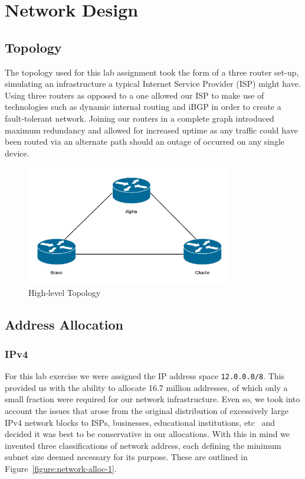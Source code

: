 \chapter{Network Design}

\section{Topology}

The topology used for this lab assignment took the form of a three router set-up,
simulating an infrastructure a typical Internet Service Provider (ISP)
might have. Using three routers as opposed to a one allowed our ISP to make use
of technologies such as dynamic internal routing and iBGP in order to create a
fault-tolerant network. Joining our routers in a complete graph introduced
maximum redundancy and allowed for increased uptime as any traffic could have
been routed via an alternate path should an outage of occurred on any single
device.

\begin{figure}[!ht]
    \caption{High-level Topology}
    \centering
    \includegraphics[width=0.8\textwidth]{images/networkTopology.png}
\end{figure}

\section{Address Allocation}
\subsection{IPv4}
For this lab exercise we were assigned the IP address space
\texttt{12.0.0.0/8}. This provided us with the ability to allocate 16.7 million
addresses, of which only a small fraction were required for our network
infrastructure. Even so, we took into account the issues that arose from the
original distribution of excessively large IPv4 network blocks to ISPs,
businesses, educational institutions, etc~\cite{ipv4alloc}\cite{internetmap}
and decided it was best to be conservative in our allocations. With this in
mind we invented three classifications of network address, each defining the
minimum subnet size deemed necessary for its purpose. These are outlined in
Figure~\ref{figure:network-alloc-1}.

